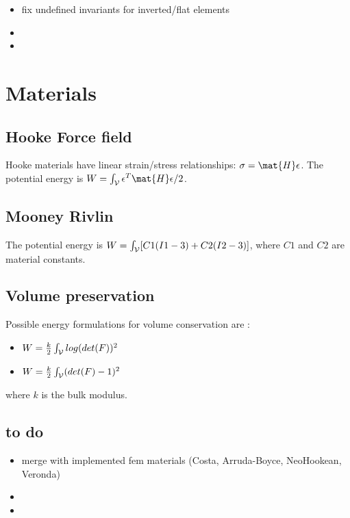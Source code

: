 \begin{itemize}
 \item fix undefined invariants for inverted/flat elements
 \item 
 \item 
\end{itemize}







\section{Materials} \label{sec materials}

\subsection{Hooke Force field}

Hooke materials have linear strain/stress relationships: $\stress=\mat{H}\strain$. 
The potential energy is $W= \int_{\volume} \strain^T\mat{H}\strain /2$. 

\subsection{Mooney Rivlin}

The potential energy is $W= \int_{\mathcal{V}} [ C1 ( I1 - 3)  + C2 ( I2 - 3) ]$, where $C1$ and $C2$ are material constants.

\subsection{Volume preservation}

Possible energy formulations for volume conservation are :
\begin{itemize}
 \item $W= \frac{k}{2} \int_{\mathcal{V}} log( det(F) )^2$
 \item $W= \frac{k}{2} \int_{\mathcal{V}} (det(F)-1)^2$
\end{itemize}
where $k$ is the bulk modulus.

\subsection{to do}

\begin{itemize}
 \item merge with implemented fem materials (Costa, Arruda-Boyce, NeoHookean, Veronda)
 \item 
 \item 
\end{itemize}

